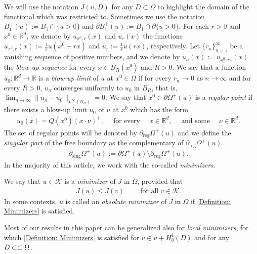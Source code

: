 \documentclass[11pt,reqno]{amsart}
\begin{document}
We will use the notation $J(u,D)$ for any $D\subset\Omega$ to highlight the domain of the functional which was restricted to. Sometimes we use the notation $B_{1}^{+}(u):=B_{1}\cap\{u>0\}$ and $\partial B_{1}^{+}(u):=B_{1}\cap\partial\{u>0\}$. For each $r>0$ and $x^{0}\in\mathbb{R}^{d}$, we denote by $u_{x^{0},r}(x)$ and $u_{r}(x)$ the functions $u_{x^{0},r}(x):=\frac{1}{r}u(x^{0}+rx)$ and $u_{r}:=\frac{1}{r}u(rx)$, respectively. Let $\{r_{n}\}_{n=1}^{\infty}$ be a vanishing sequence of positive numbers, and we denote by $u_{n}(x):=u_{x^{0},r_{n}}(x)$ the \emph{blow-up sequence} for every $x\in B_{R}(x^{0})$ and $R>0$. We say that a function $u_{0}\colon\mathbb{R}^{d}\to\mathbb{R}$ is a \emph{blow-up limit} of $u$ at $x^{0}\in\Omega$ if for every $r_{n}\to0$ as $n\to\infty$ and for every $R>0$, $u_{n}$ converges uniformly to $u_{0}$ in $B_{R}$, that is, $\lim_{n\to\infty}\|u_{n}-u_{0}\|_{L^{\infty}(B_{R})}=0$. We say that $x^{0}\in\partial\varOmega^{+}(u)$ is a \emph{regular point} if there exists a blow-up limit $u_{0}$ of $u$ at $x^{0}$ which has the form
\begin{align*}
	u_{0}(x)=Q(x^{0})(x\cdot\nu)^{+},\quad\text{ for every }\quad x\in\mathbb{R}^{d},\quad\text{ and some }\quad\nu\in\mathbb{R}^{d}.
\end{align*}
The set of regular points will be denoted by $\partial_{\mathrm{reg}}\varOmega^{+}(u)$ and we define the \emph{singular part} of the free boundary as the complementary of $\partial_{\mathrm{reg}}\varOmega^{+}(u)$
\begin{align*}
	\partial_{\mathrm{sing}}\varOmega^{+}(u):=\partial\varOmega^{+}(u)\setminus\partial_{\mathrm{reg}}\varOmega^{+}(u).
\end{align*}
In the majority of this article, we work with the so-called \emph{minimizers}.
\begin{definition}[Minimizers]
	We say that $u\in\mathcal{K}$ is a \emph{minimizer} of $J$ in $\Omega$,  provided that
	\begin{align}\label{Definition: Minimizers}
		J(u)\leqslant J(v)\qquad\text{ for all }v\in\mathcal{K}.
	\end{align}
	In some contexts, $u$ is called an \emph{absolute minimizer} of $J$ in $\Omega$ if \eqref{Definition: Minimizers} is satisfied.
\end{definition}
\begin{remark}
	Most of our results in this paper can be generalized also for \emph{local minimizers}, for which \eqref{Definition: Minimizers} is satisfied for $v\in u+H_{0}^{1}(D)$ and for any $D\subset\subset\Omega$. 
\end{remark}
\end{document}
